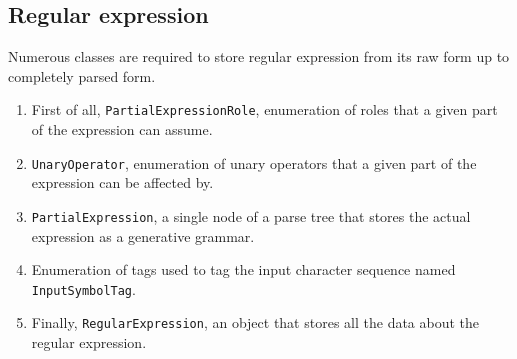 \documentclass{article}
\begin{document}
\subsection{Regular expression}
Numerous classes are required to store regular expression from its raw form up to completely parsed
form.

\begin{enumerate}

  \item First of all, \verb|PartialExpressionRole|, enumeration of roles that a given part of the
  expression can assume.

  \item \verb|UnaryOperator|, enumeration of unary operators that a given part of the expression can
  be affected by.

  \item \verb|PartialExpression|, a single node of a parse tree that stores the actual
  expression as a generative grammar.

  \item Enumeration of tags used to tag the input character sequence named \verb|InputSymbolTag|.

  \item Finally, \verb|RegularExpression|, an object that stores all the data about the regular expression.

\end{enumerate}

% 

\end{document}
